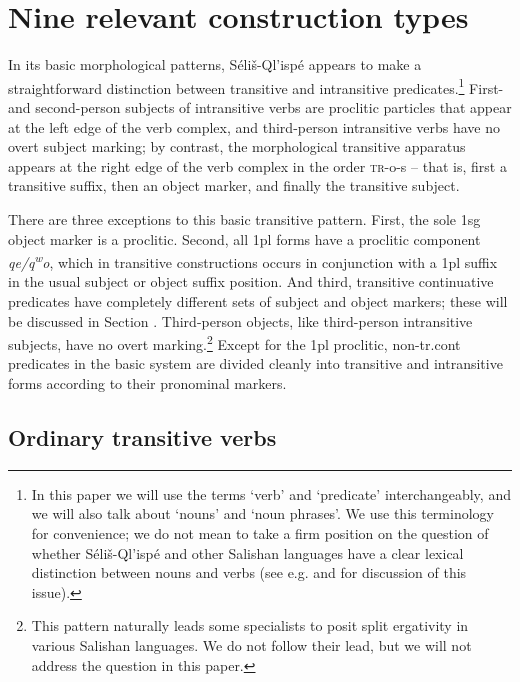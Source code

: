 \documentclass[output=paper,colorlinks,citecolor=brown]{langscibook}
\begin{document}
\section{Nine relevant construction types}
\label{thomason_section_2}
In its basic morphological patterns, S\'eli\v{s}-Ql'isp\'e appears to
make a straightforward distinction between transitive and intransitive
predicates.\footnote{In this paper we will use the terms `verb' and
`predicate' interchangeably, and we will also talk about `nouns' and
`noun phrases'.  We use this terminology for convenience; we do not
mean to take a firm position on the question of whether
S\'eli\v{s}-Ql'isp\'e and other Salishan languages have a clear
lexical distinction between nouns and verbs (see e.g. \citealt{Kinkade:1983} and
\citealt{vanEijk&Hess:1986} for discussion of this issue).}  First- and
second-person subjects of intransitive verbs are proclitic particles
that appear at the left edge of the verb complex, and third-person
intransitive verbs have no overt subject marking; by contrast, the
morphological transitive apparatus appears at the right edge of the
verb complex in the order \textsc{tr}-o-s -- that is, first a
transitive suffix, then an object marker, and finally the transitive
subject.

There are three exceptions to this basic transitive pattern.  First,
the sole 1sg object marker is a proclitic.  Second, all 1pl forms have
a proclitic component \emph{qe/{q\textsuperscript w}o}, which in
transitive constructions occurs in conjunction with a 1pl suffix in the
usual subject or object suffix position.  And third, transitive
continuative predicates have completely different sets of subject and
object markers; these will be discussed in Section .  Third-person
objects, like third-person intransitive subjects, have no overt
marking.\footnote{This pattern naturally leads some specialists to
posit split ergativity in various Salishan languages.  We do not
follow their lead, but we will not address the question in this
paper.}  Except for the 1pl proclitic, non-tr.cont predicates in
the basic system are divided cleanly into transitive and intransitive
forms according to their pronominal markers.

\subsection{Ordinary transitive verbs}  %
\label{thomason_section_2.1}
\end{document}
